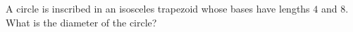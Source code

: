 A circle is inscribed in an isosceles trapezoid whose bases have lengths $4$ and $8$. What is the diameter of the circle?
